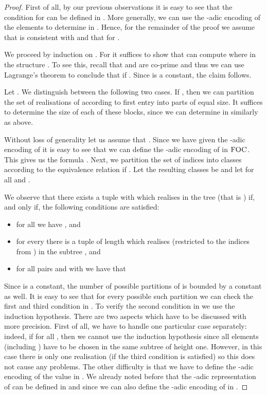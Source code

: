 \documentclass[a4paper,UKenglish]{lipics}
\newcommand{\logic}[1]{\ensuremath{\textsc{#1}}\xspace}
\newcommand{\FOC}{\logic{FOC}}
\theoremstyle{plain}
\begin{document}
\begin{proof}
 First of all, by our previous observations it is easy to see that the 
condition  for  can be defined in 
. More generally, we can use the -adic encoding of the elements 
 to determine  in . Hence, for the 
remainder of the proof we assume that  is consistent 
with  and that  for .

We proceed by induction on . For  it suffices to 
show that  can compute  where  in the 
structure . To see this, recall that  and  are co-prime and 
thus we can use Lagrange's theorem to conclude that  if . 
Since  is a constant, the claim follows.

Let . We distinguish between the following two cases. If , 
then we can partition the set of realisations  of  according 
to first entry  into  parts of 
equal size.
It suffices to determine the size of each of these blocks, since we can
determine 
in  similarly as above.

Without loss of generality let us assume that . Since 
we 
have given the -adic encoding of  it is easy to see that we can 
define the -adic encoding of  in \FOC. This gives us the formula 
.
Next, we partition the set of indices  into classes 
according to the
equivalence relation
 if . Let the
resulting
classes be  and let  for all
 and . 

We observe that there exists a tuple  with  which
realises  in the tree  (that is )
if, and only if, the following conditions are satisfied:

\begin{itemize}
 \item for all  we have , and
 \item for every  there is a 
tuple  of length  which realises  (restricted to the
indices from ) in the subtree , and
 \item for all pairs  and  with  we
have that 
  
\end{itemize}

Since  is a constant, the number of possible partitions of  is bounded by a constant as well. It is easy to see that for
every possible such partition we can check the first and third
condition in . 
To verify the second condition in  we use the induction 
hypothesis. 
There are two aspects which have to be discussed with more precision. First of
all, we have to handle one particular case separately: indeed, if 
for all , then we cannot use the induction
hypothesis since all elements (including ) have to be chosen in the 
same subtree of height one.
However, in this case there is only one realisation (if the third condition is
satisfied) so this does not cause any problems.
The other difficulty is that we have to define the -adic encoding of the
value  in . 
We already noted before 
that the -adic representation of  can be defined in  and
since  we can also define the -adic encoding of  in
.


\end{proof}
\end{document}
